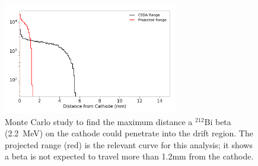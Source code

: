\begin{figure}[ht]
    \centering
    \includegraphics[width=3in]{figures/radon/betaMC_ranges_logy.png}
    \caption{Monte Carlo study to find the maximum distance a $^{212}$Bi beta (2.2~MeV) on the cathode could penetrate into the drift region. The projected range (red) is the relevant curve for this analysis; it shows a beta is not expected to travel more than 1.2mm from the cathode.}
    \label{fig:betaMC}
\end{figure}




